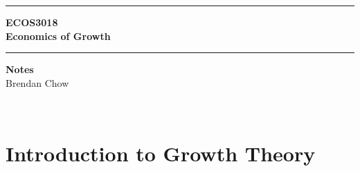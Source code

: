 \documentclass[a4paper,twoside]{article}
\numberwithin{equation}{section}
\numberwithin{figure}{section}
\begin{document}
\begin{titlepage}
	\centering
	\vspace*{4.5cm}
	\rule{\linewidth}{2pt}
	\LARGE\textbf{ECOS3018}\\
	\vspace{0.5cm}
	\Huge\textbf{Economics of Growth}\\
	\rule{\linewidth}{2pt}
	\LARGE\textbf{Notes}\\
	\vspace{1.5cm}
	\Large Brendan Chow
	\vfill
\end{titlepage}
\newpage
\
\newpage
\tableofcontents
\newpage
\
\newpage
{}
\section{Introduction to Growth Theory}\label{sec:1}
\end{document}
